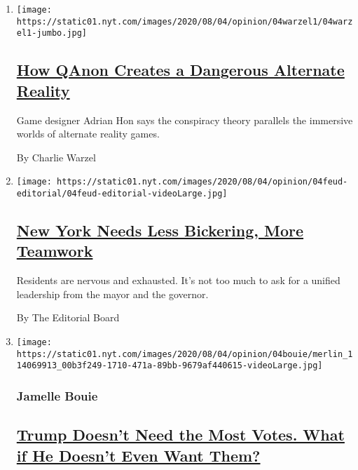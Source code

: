\begin{enumerate}
\def\labelenumi{\arabic{enumi}.}
\item
  \texttt{[image: https://static01.nyt.com/images/2020/08/04/opinion/04warzel1/04warzel1-jumbo.jpg]}

  \hypertarget{how-qanon-creates-a-dangerous-alternate-reality}{%
  \subsection{\texorpdfstring{\href{/2020/08/04/opinion/qanon-conspiracy-theory-arg.html}{How
  QAnon Creates a Dangerous Alternate
  Reality}}{How QAnon Creates a Dangerous Alternate Reality}}\label{how-qanon-creates-a-dangerous-alternate-reality}}

  Game designer Adrian Hon says the conspiracy theory parallels the
  immersive worlds of alternate reality games.

  By Charlie Warzel
\item
  \texttt{[image: https://static01.nyt.com/images/2020/08/04/opinion/04feud-editorial/04feud-editorial-videoLarge.jpg]}

  \hypertarget{new-york-needs-less-bickering-more-teamwork}{%
  \subsection{\texorpdfstring{\href{/2020/08/04/opinion/cuomo-de-blasio-coronavirus-nyc.html}{New
  York Needs Less Bickering, More
  Teamwork}}{New York Needs Less Bickering, More Teamwork}}\label{new-york-needs-less-bickering-more-teamwork}}

  Residents are nervous and exhausted. It's not too much to ask for a
  unified leadership from the mayor and the governor.

  By The Editorial Board
\item
  \texttt{[image: https://static01.nyt.com/images/2020/08/04/opinion/04bouie/merlin\_114069913\_00b3f249-1710-471a-89bb-9679af440615-videoLarge.jpg]}

  \hypertarget{jamelle-bouie}{%
  \subsubsection{Jamelle Bouie}\label{jamelle-bouie}}

  \hypertarget{trump-doesnt-need-the-most-votes-what-if-he-doesnt-even-want-them}{%
  \subsection{\texorpdfstring{\href{/2020/08/04/opinion/trump-2020-electoral-college.html}{Trump
  Doesn't Need the Most Votes. What if He Doesn't Even Want
  Them?}}{Trump Doesn't Need the Most Votes. What if He Doesn't Even Want Them?}}\label{trump-doesnt-need-the-most-votes-what-if-he-doesnt-even-want-them}}


\end{enumerate}
